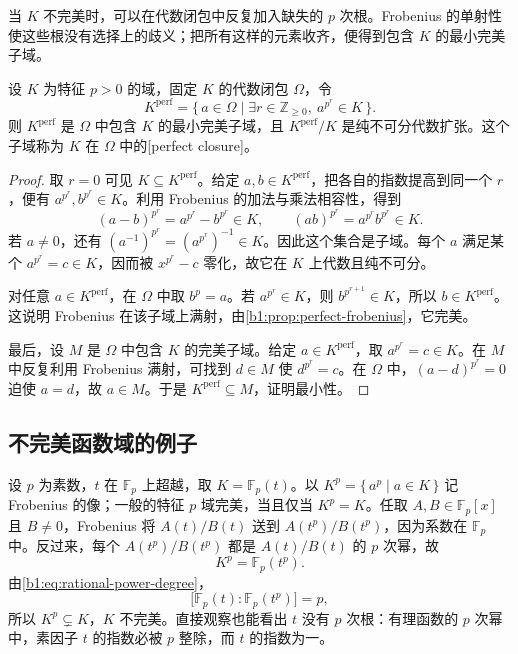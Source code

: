 当 \(K\) 不完美时，可以在代数闭包中反复加入缺失的 \(p\) 次根。Frobenius 的单射性使这些根没有选择上的歧义；把所有这样的元素收齐，便得到包含 \(K\) 的最小完美子域。

\begin{proposition}\label{b1:prop:perfect-closure}
	设 \(K\) 为特征 \(p>0\) 的域，固定 \(K\) 的代数闭包 \(\Omega\)，令
	\[
		K^{\mathrm{perf}}=\{\,a\in\Omega\mid \exists r\in\mathbb Z_{\ge0},\ a^{p^r}\in K\,\}.
	\]
	则 \(K^{\mathrm{perf}}\) 是 \(\Omega\) 中包含 \(K\) 的最小完美子域，且 \(K^{\mathrm{perf}}/K\) 是纯不可分代数扩张。这个子域称为 \(K\) 在 \(\Omega\) 中的[perfect closure]。
\end{proposition}
\begin{proof}
	取 \(r=0\) 可见 \(K\subseteq K^{\mathrm{perf}}\)。给定 \(a,b\in K^{\mathrm{perf}}\)，把各自的指数提高到同一个 \(r\)，便有 \(a^{p^r},b^{p^r}\in K\)。利用 Frobenius 的加法与乘法相容性，得到
	\[
		(a-b)^{p^r}=a^{p^r}-b^{p^r}\in K, \qquad (ab)^{p^r}=a^{p^r}b^{p^r}\in K.
	\]
	若 \(a\ne0\)，还有 \((a^{-1})^{p^r}=(a^{p^r})^{-1}\in K\)。因此这个集合是子域。每个 \(a\) 满足某个 \(a^{p^r}=c\in K\)，因而被 \(x^{p^r}-c\) 零化，故它在 \(K\) 上代数且纯不可分。

	对任意 \(a\in K^{\mathrm{perf}}\)，在 \(\Omega\) 中取 \(b^p=a\)。若 \(a^{p^r}\in K\)，则 \(b^{p^{r+1}}\in K\)，所以 \(b\in K^{\mathrm{perf}}\)。这说明 Frobenius 在该子域上满射，由\cref{b1:prop:perfect-frobenius}，它完美。

	最后，设 \(M\) 是 \(\Omega\) 中包含 \(K\) 的完美子域。给定 \(a\in K^{\mathrm{perf}}\)，取 \(a^{p^r}=c\in K\)。在 \(M\) 中反复利用 Frobenius 满射，可找到 \(d\in M\) 使 \(d^{p^r}=c\)。在 \(\Omega\) 中，\((a-d)^{p^r}=0\) 迫使 \(a=d\)，故 \(a\in M\)。于是 \(K^{\mathrm{perf}}\subseteq M\)，证明最小性。
\end{proof}

\subsection{不完美函数域的例子}
\label{b1:subsec:1603:03}

设 \(p\) 为素数，\(t\) 在 \(\mathbb F_p\) 上超越，取 \(K=\mathbb F_p(t)\)。以 \(K^p=\{\,a^p\mid a\in K\,\}\) 记 Frobenius 的像；一般的特征 \(p\) 域完美，当且仅当 \(K^p=K\)。任取 \(A,B\in\mathbb F_p[x]\) 且 \(B\neq0\)，Frobenius 将 \(A(t)/B(t)\) 送到 \(A(t^p)/B(t^p)\)，因为系数在 \(\mathbb F_p\) 中。反过来，每个 \(A(t^p)/B(t^p)\) 都是 \(A(t)/B(t)\) 的 \(p\) 次幂，故
\[
	K^p=\mathbb F_p(t^p).
\]
由\eqref{b1:eq:rational-power-degree}，
\[
	\bigl[\mathbb F_p(t):\mathbb F_p(t^p)\bigr]=p,
\]
所以 \(K^p\subsetneq K\)，\(K\) 不完美。直接观察也能看出 \(t\) 没有 \(p\) 次根：有理函数的 \(p\) 次幂中，素因子 \(t\) 的指数必被 \(p\) 整除，而 \(t\) 的指数为一。


